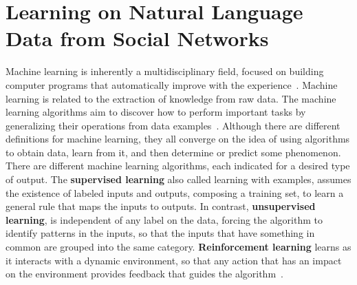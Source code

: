 \documentclass{ieeeaccess}
\begin{document}



\section{Learning on Natural Language Data from Social Networks}
\label{sec:learning}

Machine learning is inherently a multidisciplinary field, focused on building computer programs that automatically improve with the experience~\cite{boutaba-jisa-2018}. Machine learning is related to the extraction of knowledge from raw data. The machine learning algorithms aim to discover how to perform important tasks by generalizing their operations from data examples~\cite{domingos2012few}. Although there are different definitions for machine learning, they all converge on the idea of using algorithms to obtain data, learn from it, and then determine or predict some phenomenon. There are different machine learning algorithms, each indicated for a desired type of output. The \textbf{supervised learning} also called learning with examples, assumes the existence of labeled inputs and outputs, composing a training set, to learn a general rule that maps the inputs to outputs. In contrast, \textbf{unsupervised learning}, is independent of any label on the data, forcing the algorithm to identify patterns in the inputs, so that the inputs that have something in common are grouped into the same category. \textbf{Reinforcement learning} learns as it interacts with a dynamic environment, so that any action that has an impact on the environment provides feedback that guides the  algorithm~\cite{ayodele2010types}.
\end{document}
